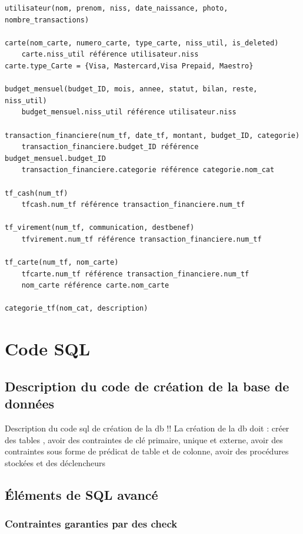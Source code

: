 \documentclass[a4paper,12pt]{article}
\begin{document}
\begin{verbatim}
utilisateur(nom, prenom, niss, date_naissance, photo, nombre_transactions)

carte(nom_carte, numero_carte, type_carte, niss_util, is_deleted)
	carte.niss_util référence utilisateur.niss
carte.type_Carte = {Visa, Mastercard,Visa Prepaid, Maestro}

budget_mensuel(budget_ID, mois, annee, statut, bilan, reste, niss_util) 
	budget_mensuel.niss_util référence utilisateur.niss

transaction_financiere(num_tf, date_tf, montant, budget_ID, categorie)
	transaction_financiere.budget_ID référence budget_mensuel.budget_ID
	transaction_financiere.categorie référence categorie.nom_cat

tf_cash(num_tf)
	tfcash.num_tf référence transaction_financiere.num_tf

tf_virement(num_tf, communication, destbenef)
	tfvirement.num_tf référence transaction_financiere.num_tf

tf_carte(num_tf, nom_carte)
	tfcarte.num_tf référence transaction_financiere.num_tf	
	nom_carte référence carte.nom_carte

categorie_tf(nom_cat, description)
\end{verbatim}

\newpage

\section{Code SQL}

\subsection{Description du code de création de la base de données}

Description du code sql de création de la db 
!! La création de la db doit : créer des tables , avoir des contraintes de clé primaire, unique et externe, avoir des contraintes sous forme de prédicat de table et de colonne, avoir des procédures stockées et des déclencheurs

\subsection{Éléments de SQL avancé}

\subsubsection{Contraintes garanties par des check}
\end{document}
